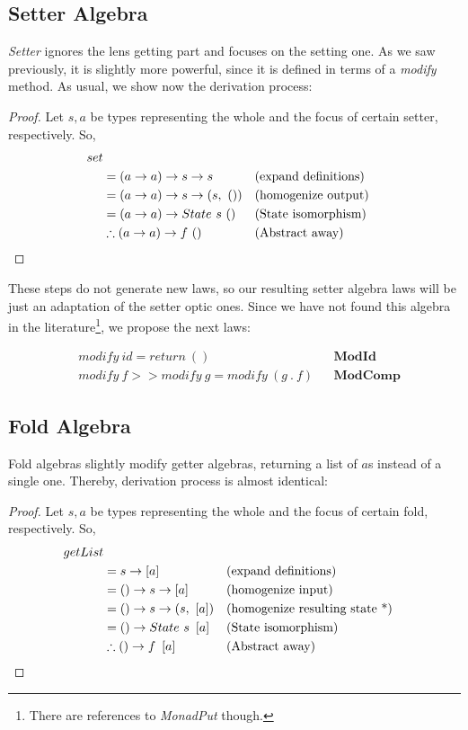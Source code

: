 \documentclass[a4paper]{article}
\begin{document}
\subsection{Setter Algebra}

\emph{Setter} ignores the lens getting part and focuses on the setting one. As
we saw previously, it is slightly more powerful, since it is defined in terms of
a \emph{modify} method. As usual, we show now the derivation process:

\begin{proof}
  Let $s, a$ be types representing the whole and the focus of certain setter,
  respectively. So,
  \begin{align*}
    set \\
    &= (a \rightarrow a) \rightarrow s \rightarrow s &&\text{(expand definitions)} \\
    &= (a \rightarrow a) \rightarrow s \rightarrow (s,\ ()) &&\text{(homogenize output)} \\
    &= (a \rightarrow a) \rightarrow State\ s\ () &&\text{(State isomorphism)} \\
    &\therefore (a \rightarrow a) \rightarrow f\ () &&\text{(Abstract away)}\qedhere
  \end{align*}
\end{proof}

These steps do not generate new laws, so our resulting setter algebra laws will
be just an adaptation of the setter optic ones. Since we have not found this
algebra in the literature\footnote{There are references to \emph{MonadPut}
though.}, we propose the next laws:

\begin{align*}
  & modify\ id = return\ () &&\textbf{ModId} \\
  & modify\ f >> modify\ g = modify\ (g\ .\ f) &&\textbf{ModComp}
\end{align*}

\subsection{Fold Algebra}

Fold algebras slightly modify getter algebras, returning a list of $a$s instead
of a single one. Thereby, derivation process is almost identical:

\begin{proof}
  Let $s, a$ be types representing the whole and the focus of certain fold,
  respectively. So,
  \begin{align*}
    getList \\
    &= s \rightarrow \left[a\right] &&\text{(expand definitions)} \\
    &= () \rightarrow s \rightarrow \left[a\right] &&\text{(homogenize input)} \\
    &= () \rightarrow s \rightarrow (s,\ \left[a\right]) &&\text{(homogenize resulting state *)} \\
    &= () \rightarrow State\ s\ \left[a\right] &&\text{(State isomorphism)} \\
    &\therefore () \rightarrow f\ \left[a\right] &&\text{(Abstract away)}\qedhere
  \end{align*}
\end{proof}
\end{document}
